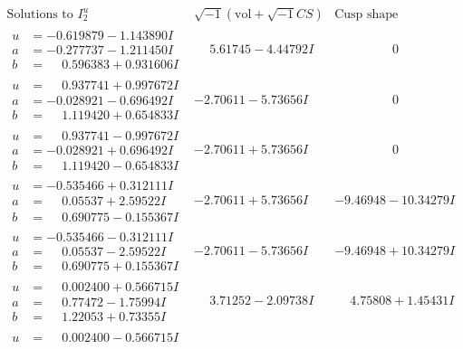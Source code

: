 \documentclass[1p]{elsarticle_modified}
\theoremstyle{definition}
\newcommand{\I}{\sqrt{-1}}
\begin{document}
$$\begin{array}{c|c|c}
\text{Solutions to }I^u_{2}& \I (\text{vol} + \sqrt{-1}CS) & \text{Cusp shape}\\
 \hline 
\begin{aligned}
u &= -0.619879 - 1.143890 I \\
a &= -0.277737 - 1.211450 I \\
b &= \phantom{-}0.596383 + 0.931606 I\end{aligned}
 & \phantom{-}5.61745 - 4.44792 I & \phantom{-0.000000 } 0 \\ \hline\begin{aligned}
u &= \phantom{-}0.937741 + 0.997672 I \\
a &= -0.028921 - 0.696492 I \\
b &= \phantom{-}1.119420 + 0.654833 I\end{aligned}
 & -2.70611 - 5.73656 I & \phantom{-0.000000 } 0 \\ \hline\begin{aligned}
u &= \phantom{-}0.937741 - 0.997672 I \\
a &= -0.028921 + 0.696492 I \\
b &= \phantom{-}1.119420 - 0.654833 I\end{aligned}
 & -2.70611 + 5.73656 I & \phantom{-0.000000 } 0 \\ \hline\begin{aligned}
u &= -0.535466 + 0.312111 I \\
a &= \phantom{-}0.05537 + 2.59522 I \\
b &= \phantom{-}0.690775 - 0.155367 I\end{aligned}
 & -2.70611 + 5.73656 I & -9.46948 - 10.34279 I \\ \hline\begin{aligned}
u &= -0.535466 - 0.312111 I \\
a &= \phantom{-}0.05537 - 2.59522 I \\
b &= \phantom{-}0.690775 + 0.155367 I\end{aligned}
 & -2.70611 - 5.73656 I & -9.46948 + 10.34279 I \\ \hline\begin{aligned}
u &= \phantom{-}0.002400 + 0.566715 I \\
a &= \phantom{-}0.77472 - 1.75994 I \\
b &= \phantom{-}1.22053 + 0.73355 I\end{aligned}
 & \phantom{-}3.71252 - 2.09738 I & \phantom{-}4.75808 + 1.45431 I \\ \hline\begin{aligned}
u &= \phantom{-}0.002400 - 0.566715 I \\

\end{aligned}
\end{array}$$
\end{document}
